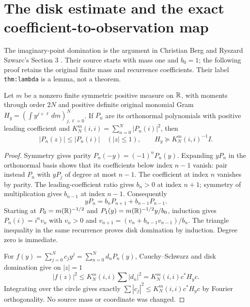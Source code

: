 \documentclass[11pt]{article}
\begin{document}
\section{The disk estimate and the exact coefficient-to-observation map}

The imaginary-point domination is the argument in Christian Berg and
Ryszard Szwarc's Section 3 \cite{lgamma:BS}.  Their source starts with mass one
and $b_0=1$; the following proof retains the original finite mass and
recurrence coefficients.  Their label \texttt{thm:lambda} is a lemma,
not a theorem.

\begin{lgammalemma}\label{lgamma:lem:disk}
Let $m$ be a nonzero finite symmetric positive measure on $\mathbb R$, with
moments through order $2N$ and positive definite original monomial Gram
$H_y=(\int y^{j+\ell}\,dm)_{j,\ell=0}^N$.  If $P_n$ are its
orthonormal polynomials with positive leading coefficient and
$K_N^m(i,i)=\sum_{n=0}^N|P_n(i)|^2$, then
\begin{equation}\label{lgamma:eq:diskgram}
 |P_n(z)|\le|P_n(i)|\quad(|z|\le1),\qquad
 H_y\succeq K_N^m(i,i)^{-1}I.
\end{equation}
\end{lgammalemma}
\begin{proof}
Symmetry gives parity $P_n(-y)=(-1)^nP_n(y)$.  Expanding $yP_n$ in
the orthonormal basis shows that its coefficients below index $n-1$
vanish: pair instead $P_n$ with $yP_j$ of degree at most $n-1$.
The coefficient at index $n$ vanishes by parity.  The leading-coefficient
ratio gives $b_n>0$ at index $n+1$; symmetry of multiplication gives
$b_{n-1}$ at index $n-1$.  Consequently
\[
 yP_n=b_nP_{n+1}+b_{n-1}P_{n-1}.
\]
Starting at $P_0=m(\mathbb R)^{-1/2}$ and
$P_1(y)=m(\mathbb R)^{-1/2}y/b_0$, induction gives
$P_n(i)=i^nv_n$ with $v_n>0$ and
$v_{n+1}=(v_n+b_{n-1}v_{n-1})/b_n$.
The triangle inequality in the same recurrence proves disk domination
by induction.  Degree zero is immediate.

For $f(y)=\sum_{j=0}^Nc_jy^j=\sum_{n=0}^Nd_nP_n(y)$,
Cauchy--Schwarz and disk domination give on $|z|=1$
\[
 |f(z)|^2\le K_N^m(i,i)\sum|d_n|^2
 =K_N^m(i,i)c^*H_yc.
\]
Integrating over the circle gives exactly
$\sum|c_j|^2\le K_N^m(i,i)c^*H_yc$ by Fourier orthogonality.
No source mass or coordinate was changed.
\end{proof}
\end{document}
